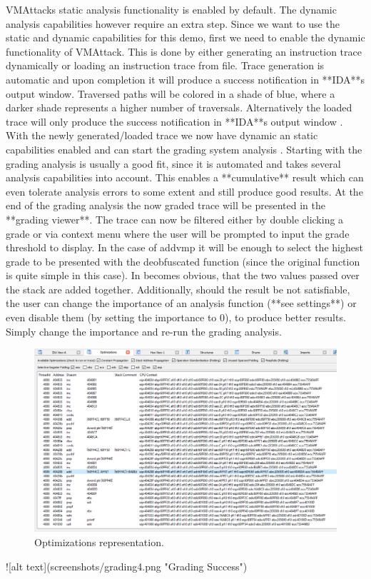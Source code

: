 \documentclass[10pt,twoside,a4paper,bibliography=totoc]{scrbook}
\begin{document}
VMAttacks static analysis functionality is enabled by default. The dynamic analysis capabilities however require an extra step. Since we want to use the static and dynamic capabilities for this demo, first we need to enable the dynamic functionality of VMAttack. This is done by either generating an instruction trace dynamically or loading an instruction trace from file. Trace generation is automatic and upon completion it will produce a success notification in **IDA**s output window. Traversed paths will be colored in a shade of blue, where a darker shade represents a higher number of traversals. Alternatively the loaded trace will only produce the success notification in **IDA**s output window .
With the newly generated/loaded trace we now have dynamic an static capabilities enabled and can start the  grading system analysis . Starting with the  grading analysis  is usually a good fit, since it is automated and takes several analysis capabilities into account. This enables a **cumulative** result which can even tolerate analysis errors to some extent and still produce good results. At the end of the grading analysis the now graded trace will be presented in the **grading viewer**. The trace can now be filtered either by double clicking a grade or via context menu where the user will be prompted to input the grade threshold to display.
In the case of addvmp it will be enough to select the highest grade to be presented with the deobfuscated function (since the original function is quite simple in this case). In becomes obvious, that the two values passed over the stack are added together. Additionally, should the result be not satisfiable, the user can change the importance of an analysis function (**see settings**) or even disable them (by setting the importance to 0), to produce better results. Simply change the importance and re-run the grading analysis.

\begin{figure}[htp]
\centering
\includegraphics[scale=0.55]{images/ch3/optimizations_success.png}
\caption{Optimizations representation.}
\label{opti_add_success}
\end{figure}
![alt text](screenshots/grading4.png "Grading Success")
\end{document}
